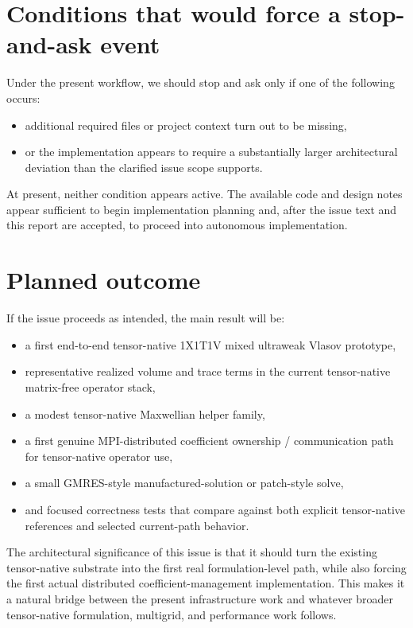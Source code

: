 \documentclass[11pt]{article}
\begin{document}
\section{Conditions that would force a stop-and-ask event}

Under the present workflow, we should stop and ask only if one of the following occurs:
\begin{itemize}[leftmargin=2em]
\item additional required files or project context turn out to be missing,
\item or the implementation appears to require a substantially larger architectural deviation than the clarified issue scope supports.
\end{itemize}

At present, neither condition appears active. The available code and design notes appear sufficient to begin implementation planning and, after the issue text and this report are accepted, to proceed into autonomous implementation.

\section{Planned outcome}

If the issue proceeds as intended, the main result will be:
\begin{itemize}[leftmargin=2em]
\item a first end-to-end tensor-native 1X1T1V mixed ultraweak Vlasov prototype,
\item representative realized volume and trace terms in the current tensor-native matrix-free operator stack,
\item a modest tensor-native Maxwellian helper family,
\item a first genuine MPI-distributed coefficient ownership / communication path for tensor-native operator use,
\item a small GMRES-style manufactured-solution or patch-style solve,
\item and focused correctness tests that compare against both explicit tensor-native references and selected current-path behavior.
\end{itemize}

The architectural significance of this issue is that it should turn the existing tensor-native substrate into the first real formulation-level path, while also forcing the first actual distributed coefficient-management implementation. This makes it a natural bridge between the present infrastructure work and whatever broader tensor-native formulation, multigrid, and performance work follows.
\end{document}

